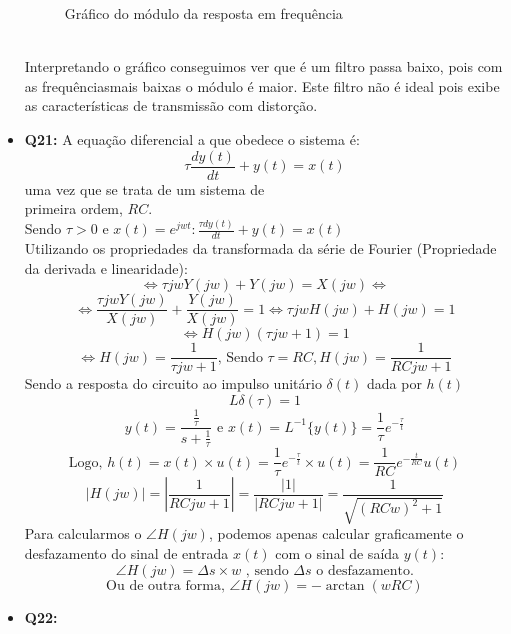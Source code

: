 \documentclass[a4paper, 12pt]{article}
\begin{document}
\begin{itemize}
\begin{figure}[!ht]
              \vspace{-10px}
              \caption{Gráfico do módulo da resposta em frequência}
          \end{figure}
          \\Interpretando o gráfico conseguimos ver que é um filtro passa baixo, pois com as frequênciasmais baixas o módulo é maior. Este filtro não é ideal pois exibe as características de transmissão com distorção.
    \item \textbf{Q21:} A equação diferencial a que obedece o sistema é:
          \[\tau\frac{dy(t)}{dt} + y(t) = x(t)\]
          uma vez que se trata de um sistema de\\
          primeira ordem, $RC$.\\
          Sendo $\tau>0$ e $x(t) = e^{jwt}: \frac{\tau dy(t)}{dt} + y(t) = x(t)$\\
          Utilizando os propriedades da transformada da série de Fourier (Propriedade da derivada e linearidade):
          \[\Leftrightarrow \tau jwY(jw) + Y(jw) = X(jw)\Leftrightarrow\]
          \[\Leftrightarrow \frac{\tau jwY(jw)}{X(jw)} + \frac{Y(jw)}{X(jw)} = 1 \Leftrightarrow \tau jwH(jw) + H(jw) = 1\]
          \[\Leftrightarrow H(jw)(\tau jw + 1) = 1\]
          \[\Leftrightarrow H(jw) = \frac{1}{\tau jw + 1} \textrm{, Sendo } \tau = RC, H(jw) = \frac{1}{RCjw + 1}\]
          Sendo a resposta do circuito ao impulso unitário $\delta(t)$ dada por $h(t)$
          \[L\delta(\tau) = 1\]
          \[y(t) = \frac{\frac{1}{\tau}}{s + \frac{1}{\tau}} \textrm{ e } x(t) = L^{-1}\{y(t)\} = \frac{1}{\tau}e^{-\frac{\tau}{t}}\]
          \[\textrm{Logo, } h(t) = x(t)\times u(t) = \frac{1}{\tau}e^{-\frac{\tau}{t}} \times u(t) = \frac{1}{RC}e^{-\frac{t}{RC}}u(t)\]
          \[ |H(jw)| = |\frac{1}{RCjw + 1}| = \frac{|1|}{|RCjw +1|} = \frac{1}{\sqrt{{(RCw)}^{2} + 1}}\]
          Para calcularmos o $\angle H(jw)$, podemos apenas calcular graficamente o desfazamento do sinal de entrada $x(t)$ com o sinal de saída $y(t)$:
          \[\angle H(jw) = \Delta s \times w \textrm{ , sendo } \Delta s \textrm{ o desfazamento.}\]
          \[\textrm{Ou de outra forma, } \angle H(jw) = -\arctan(wRC)\]
    \item \textbf{Q22:}
\end{itemize}
\newpage
\end{document}
